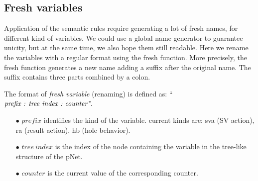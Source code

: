 \documentclass{lncs/llncs}
\newcommand{\TODO}[1]{\textcolor{red}{\textbf{[TODO:#1]}}}
\begin{document}
  
  

\subsection{Fresh variables}


Application of the semantic rules require generating a lot of fresh
names, for different kind of variables. We could use a global name
generator to guarantee unicity, but 
at the same time, we also hope them still
readable. Here we rename the variables with a regular format using the fresh function.
More precisely, the fresh function generates a new name adding a
suffix after the original name. The suffix contains three parts
combined by a colon.  


\begin{definition}\label{fresh-variable}
The format of \emph{fresh variable} (renaming) is defined as:
``$\emph{prefix : tree\ index\ :\ counter}$''.
\begin{itemize}
   \item[$\bullet$] $prefix$ identifies the kind of the
     variable. current kinds are: sva (SV action), ra (result action), hb (hole behavior).
   \item[$\bullet$] $tree\ index$ is the index of the node containing the variable in the tree-like structure of the pNet.
   \item[$\bullet$] $counter$ is the current value of the corresponding counter.
\end{itemize}
\end{definition}


\end{document}
